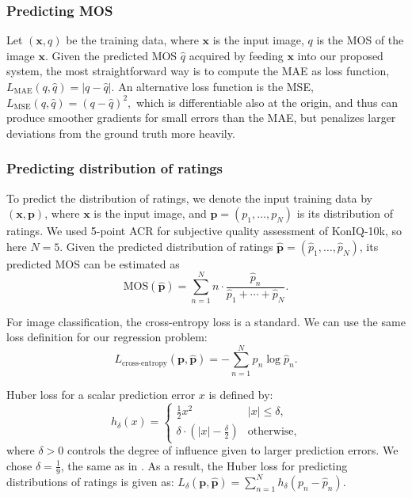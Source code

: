 \documentclass[10pt,journal,compsoc]{IEEEtran}
\begin{document}
\subsubsection{Predicting MOS}
Let $(\textbf{x}, q)$ be the training data, where $\textbf{x}$ is the input image, $q$ is the MOS of the image $\textbf{x}$. 
Given the predicted MOS $\hat{q}$ acquired by feeding $\textbf{x}$ into our proposed system, the most straightforward way is to compute the MAE as loss function,
$
L_{\text{MAE}}(q,\hat{q}) =|q-\hat{q}|.
$
An alternative loss function is the MSE, 
$
L_{\text{MSE}}(q,\hat{q}) = (q-\hat{q})^2,
$
which is differentiable also at the origin, and thus can produce smoother gradients for small errors than the MAE, but penalizes larger deviations from the ground truth more heavily. 




\subsubsection{Predicting distribution of ratings}

To predict the distribution of ratings, we denote the input training data by $(\textbf{x}, \textbf{p})$, where $\textbf{x}$ is the input image, and $\textbf{p} = (p_1, \ldots, p_N)$ is its distribution of ratings. We used 5-point ACR for subjective quality assessment of KonIQ-10k, so here $N=5$.
Given the predicted distribution of ratings   $\hat{\textbf{p}} = (\hat{p}_1, \ldots, \hat{p}_N)$, its predicted MOS can be estimated as
\begin{equation}\nonumber
\mathrm{MOS}(\hat{\textbf{p}}) = \sum_{n=1}^N n \cdot \frac{\hat{p}_n}{\hat{p}_1 + \cdots + \hat{p}_N}.
\end{equation}


For image classification, the cross-entropy loss is a standard. We can use the same loss definition for our regression problem:
\begin{equation}\nonumber
    L_{\text{cross-entropy}}(\textbf{p},\hat{\textbf{p}})= 
        -\sum_{n=1}^N p_n \log\hat{p}_n.
\end{equation}

\noindent Huber loss for a scalar prediction error $x$ is defined by:
\begin{equation}\nonumber
h_{\delta}(x)=
\begin{cases}
\frac{1}{2}x^2 & |x|\leq \delta, \\
\delta \cdot (|x|-\frac{\delta}{2}) & \text{otherwise,}
\end{cases}
\end{equation}
where $\delta>0$ controls the degree of influence given to larger prediction errors. We chose $\delta=\frac{1}{9}$, the same as in \cite{varga2018deeprn}. As a result, the Huber loss for predicting distributions of ratings is given as:
$
L_{\delta}(\textbf{p},\hat{\textbf{p}})=\sum_{n=1}^N h_{\delta}(p_n-\hat{p}_n).
$
\end{document}
